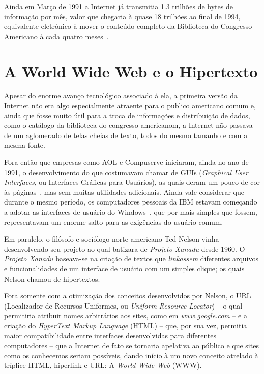 \documentclass[conference]{IEEEtran}
\begin{document}
  Ainda em Março de 1991 a Internet já transmitia 1.3 trilhões de bytes de
  informação por mês, valor que chegaria à quase 18 trilhões ao final de 1994,
  equivalente eletrônico à mover o conteúdo completo da Biblioteca do Congresso
  Americano à cada quatro meses~\cite{nsfnet}.
  
\section{A World Wide Web e o Hipertexto}

	Apesar do enorme avanço tecnológico associado à ela, a primeira versão da Internet não era algo especialmente atraente para o publico americano comum e, ainda que fosse muito útil para a troca de informações e distribuição de dados, como o catálogo da biblioteca do congresso americanom, a Internet não passava de um aglomerado de telas cheias de texto, todos do mesmo tamanho e com a mesma fonte.~\cite{www}
	
	Fora então que empresas como AOL e Compuserve iniciaram, ainda no ano de 1991, o desenvolvimento do que costumavam chamar de GUIs (\emph{Graphical User Interfaces}, ou Interfaces Gráficas para Usuários), as quais deram um pouco de cor às páginas~\cite{www}, mas sem muitas utilidades adicionais. Ainda vale considerar que durante o mesmo período, os computadores pessoais da IBM estavam começando a adotar as interfaces de usuário do Windows~\cite{www}, que por mais simples que fossem, representavam um enorme salto para as exigências do usuário comum.
	
	Em paralelo, o filósofo e sociólogo norte americano Ted Nelson vinha desenvolvendo seu projeto ao qual batizara de \emph{Projeto Xanadu} desde 1960. O \emph{Projeto Xanadu} baseava-se na criação de textos que \emph{linkassem} diferentes arquivos e funcionalidades de um interface de usuário com um simples clique; os quais Nelson chamou de hipertextos.~\cite{wired}
	
	Fora somente com a otimização dos conceitos desenvolvidos por Nelson, o URL (Localizador de Recursos Uniformes, ou \emph{Uniform Resource Locator}) -- o qual permitiria atribuir nomes arbitrários aos sites, como em \emph{www.google.com} -- e a criação do \emph{HyperText Markup Language} (HTML) -- que, por sua vez, permitia maior compatibilidade entre interfaces desenvolvidas para diferentes computadores -- que a Internet de fato se tornaria apelativa ao público e que sites como os conhecemos seriam possíveis, dando início à um novo conceito atrelado à tríplice HTML, hiperlink e URL: A \emph{World Wide Web} (WWW).
	
\end{document}
